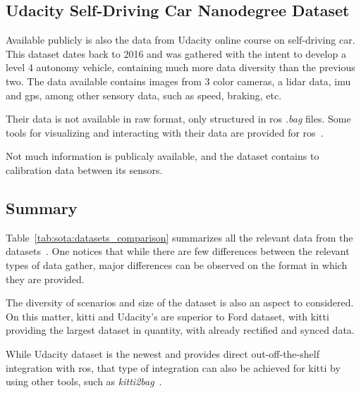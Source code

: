 \subsection{Udacity Self-Driving Car Nanodegree Dataset}
Available publicly is also the data from Udacity online course on self-driving car. This dataset dates back to 2016 and was gathered with the intent to develop a level 4 autonomy vehicle, containing much more data diversity than the previous two. The data available contains images from 3 color cameras, a \ac{lidar} data, \ac{imu} and \ac{gps}, among other sensory data, such as speed, braking, etc.

Their data is not available in raw format, only structured in \ac{ros} \textit{.bag} files. Some tools for visualizing and interacting with their data are provided for \ac{ros}~\cite{udacity}. 

Not much information is publicaly available, and the dataset contains to calibration data between its sensors.

\subsection{Summary}
Table~\ref{tab:sota:datasets_comparison} summarizes all the relevant data from the datasets~\cite{udacity, Pandey2011, Geiger2013a}. One notices that while there are few differences between the relevant types of data gather, major differences can be observed on the format in which they are provided. 

The diversity of scenarios and size of the dataset is also an aspect to considered. On this matter, \ac{kitti} and Udacity's are superior to Ford dataset, with \ac{kitti} providing the largest dataset in quantity, with already rectified and synced data. 

While Udacity dataset is the newest and provides direct out-off-the-shelf integration with \ac{ros}, that type of integration can also be achieved for \ac{kitti} by using other tools, such as \textit{kitti2bag}~\cite{TomasKrejci}. 
	
